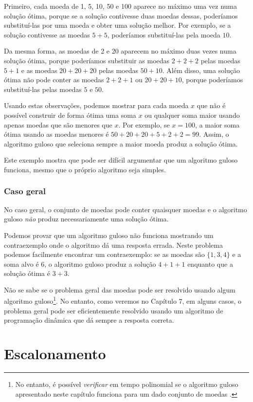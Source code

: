 Primeiro, cada moeda de 1, 5, 10, 50 e 100 aparece
no máximo uma vez numa solução ótima,
porque se a
solução contivesse duas moedas dessas,
poderíamos substituí-las por uma moeda e
obter uma solução melhor.
Por exemplo, se a solução contivesse
as moedas $5+5$, poderíamos substituí-las pela moeda $10$.

Da mesma forma, as moedas de 2 e 20 aparecem
no máximo duas vezes numa solução ótima,
porque poderíamos substituir
as moedas $2+2+2$ pelas moedas $5+1$ e
as moedas $20+20+20$ pelas moedas $50+10$.
Além disso, uma solução ótima não pode conter
as moedas $2+2+1$ ou $20+20+10$,
porque poderíamos substituí-las pelas moedas $5$ e $50$.

Usando estas observações,
podemos mostrar para cada moeda $x$ que
não é possível construir de forma ótima
uma soma $x$ ou qualquer soma maior usando apenas moedas
que são menores que $x$.
Por exemplo, se $x=100$, a maior soma ótima
usando as moedas menores é $50+20+20+5+2+2=99$.
Assim, o algoritmo guloso que seleciona sempre
a maior moeda produz a solução ótima.

Este exemplo mostra que pode ser difícil
argumentar que um algoritmo guloso funciona,
mesmo que o próprio algoritmo seja simples.

\subsubsection{Caso geral}

No caso geral, o conjunto de moedas pode conter quaisquer moedas
e o algoritmo guloso \emph{não} produz necessariamente
uma solução ótima.

Podemos provar que um algoritmo guloso não funciona
mostrando um contraexemplo
onde o algoritmo dá uma resposta errada.
Neste problema podemos facilmente encontrar um contraexemplo:
se as moedas são $\{1,3,4\}$ e a soma alvo
é 6, o algoritmo guloso produz a solução
$4+1+1$ enquanto que a solução ótima é $3+3$.

Não se sabe se o problema geral das moedas
pode ser resolvido usando algum algoritmo guloso\footnote{No entanto, é possível
\emph{verificar} em tempo polinomial
se o algoritmo guloso apresentado neste capítulo funciona para
um dado conjunto de moedas \cite{pea05}.}.
No entanto, como veremos no Capítulo 7,
em alguns casos,
o problema geral pode ser eficientemente
resolvido usando um algoritmo de
programação dinâmica que dá sempre a resposta correta.

\section{Escalonamento}

